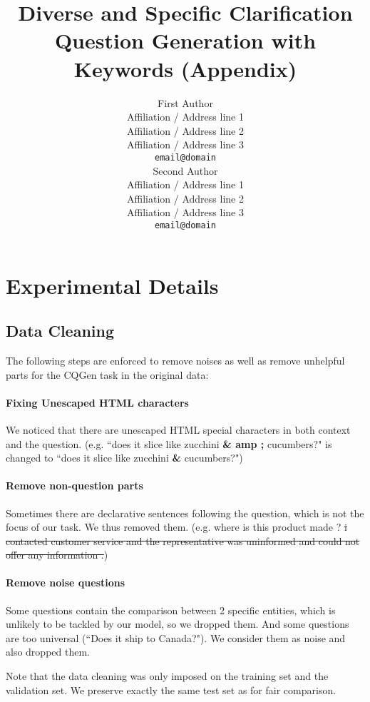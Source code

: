 \documentclass[11pt,a4paper]{article}
\title{Diverse and Specific Clarification Question Generation with Keywords (Appendix)}
\author{First Author \\
  Affiliation / Address line 1 \\
  Affiliation / Address line 2 \\
  Affiliation / Address line 3 \\
  \texttt{email@domain} \\\And
  Second Author \\
  Affiliation / Address line 1 \\
  Affiliation / Address line 2 \\
  Affiliation / Address line 3 \\
  \texttt{email@domain} \\}
\date{}
\begin{document}
\maketitle

\appendix

\section{Experimental Details}
\label{sec:detail}
\subsection{Data Cleaning}
The following steps are enforced to remove noises as well as remove unhelpful parts for the CQGen task in the original data:

\paragraph{Fixing Unescaped HTML characters} We noticed that there are unescaped HTML special characters in both context and the question. (e.g. ``does it slice like zucchini \textbf{\& amp ;} cucumbers?" is changed to ``does it slice like zucchini \textbf{\&} cucumbers?")

\paragraph{Remove non-question parts} Sometimes there are declarative sentences following the question, which is not the focus of our task. We thus removed them. (e.g. where is this product made ? \sout{i contacted customer service and the representative was uninformed and could not offer any information .})

\paragraph{Remove noise questions} Some questions contain the comparison between 2 specific entities, which is unlikely to be tackled by our model, so we dropped them. And some questions are too universal (``Does it ship to Canada?"). We consider them as noise and also dropped them.

Note that the data cleaning was only imposed on the training set and the validation set. We preserve exactly the same test set as \citet{rao2019answer} for fair comparison.
\end{document}
